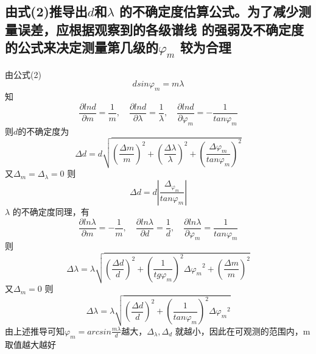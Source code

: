 \documentclass[12pt, a4paper, oneside]{ctexbook}
\begin{document}
\subsection*{由式(2)推导出$ d $和$ \lambda $ 的不确定度估算公式。为了减少测量误差，应根据观察到的各级谱线
    的强弱及不确定度的公式来决定测量第几级的$ \varphi_m $ 较为合理}

由公式(2)
$$
    dsin\varphi_m=m\lambda
$$
知$$
    \frac{\partial lnd}{\partial m}=\frac{1}{m},\quad \frac{\partial lnd}{\partial \lambda}=\frac{1}{\lambda},\quad \frac{\partial lnd}{\partial \varphi_m}=-\frac{1}{tan\varphi_m}
$$
则$d$的不确定度为$$
    \Delta d=d\sqrt{(\frac{\Delta m}{m})^{2}+(\frac{\Delta\lambda}{\lambda})^{2}+(\frac{\Delta\varphi_{m}}{tan\varphi_{m}})^{2}}
$$
又$ \Delta_m=\Delta_\lambda=0 $
则$$
    \Delta d=d\left|\frac{\Delta_{\varphi_m}}{tan\varphi_m}\right|
$$
$ \lambda $ 的不确定度同理，有$$
    \frac{\partial ln\lambda}{\partial m}=-\frac{1}{m},\quad \frac{\partial ln\lambda}{\partial d}=\frac{1}{d},\quad \frac{\partial ln\lambda}{\partial \varphi_m}=\frac{1}{tan\varphi_m}
$$
则$$
    \Delta\lambda=\lambda\sqrt{(\frac{\Delta d}{d})^{2}+(\frac{1}{t g\varphi_{m}})^{2}{\Delta\varphi_{m}}^{2}+(\frac{\Delta m}{m})^{2}}
$$
又$ \Delta_m=0 $
则$$
    \Delta\lambda=\lambda\sqrt{(\frac{\Delta d}{d})^{2}+(\frac{1}{tan\varphi_{m}})^{2}\Delta{\varphi_{m}}^{2}}
$$
由上述推导可知$ \varphi_m=arcsin\frac{m\lambda}{d} $越大，$ \Delta_\lambda,\Delta_d $ 就越小，因此在可观测的范围内，m取值越大越好
\end{document}

